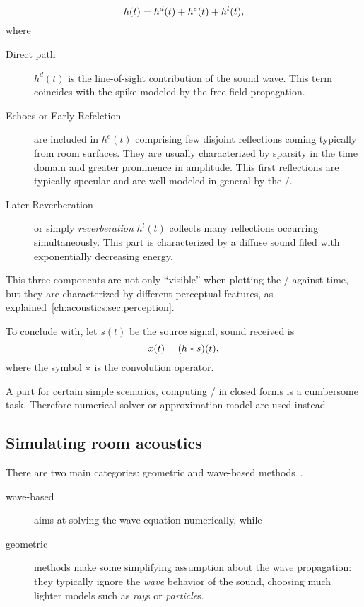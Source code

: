 \begin{equation}\label{eq:acoustics:rir_full}
h(t) = h^d(t) + h^e(t) + h^l(t)
,
\end{equation}
where
\begin{description}
    \item[Direct path] $h^d(t)$ is the line-of-sight contribution of the sound wave.
    This term coincides with the spike modeled by the free-field propagation.
    \item[Echoes or Early Refelction] are included in $h^e(t)$ comprising few disjoint reflections coming typically from room surfaces.
    They are usually characterized by sparsity in the time domain and greater prominence in amplitude.
    This first reflections are typically specular and are well modeled in general by the \ISM/.
    \item[Later Reverberation] or simply \textit{reverberation} $h^l(t)$ collects many reflections occurring simultaneously.
    This part is characterized by a diffuse sound filed with exponentially decreasing energy.
\end{description}
This three components are not only ``visible'' when plotting the \RIR/ against time,
but they are characterized by different perceptual features, as explained~\cref{ch:acoustics:sec:perception}.

To conclude with, let $s(t)$ be the source signal, sound received is
\begin{equation}
    x(t) = (h \ast s)(t)
    ,
\end{equation}
where the symbol $\ast$ is the convolution operator.

A part for certain simple scenarios, computing \RIRs/ in closed forms is a cumbersome task.
Therefore numerical solver or approximation model are used instead.

\subsection{Simulating room acoustics}\label{sec:acoustics:simulators}
There are two main categories: geometric and wave-based methods~.
\begin{description}
    \item[wave-based] aims at solving the wave equation numerically, while
    \item[geometric] methods make some simplifying assumption about the wave propagation:
    they typically ignore the \textit{wave} behavior of the sound, choosing much lighter models such as \textit{ray}s or \textit{particle}s.
\end{description}

